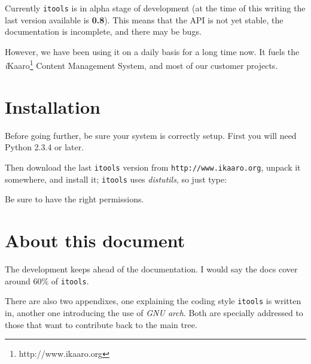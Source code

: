 Currently {\tt itools} is in alpha stage of development (at the time of
this writing the last version available is {\bf 0.8}). This means that the
API is not yet stable, the documentation is incomplete, and there may be bugs.

However, we have been using it on a daily basis for a long time now. It
fuels the {\em i}Kaaro\footnote{http://www.ikaaro.org} Content Management
System, and most of our customer projects.


\section{Installation}

Before going further, be sure your system is correctly setup. First you
will need Python 2.3.4 or later.

Then download the last {\tt itools} version from {\tt http://www.ikaaro.org},
unpack it somewhere, and install it; {\tt itools} uses {\em distutils}, so
just type:


Be sure to have the right permissions.


\section{About this document}

The development keeps ahead of the documentation. I would say the docs cover
around 60\% of {\tt itools}.

There are also two appendixes, one explaining the coding style {\tt itools}
is written in, another one introducing the use of {\em GNU arch}. Both are
specially addressed to those that want to contribute back to the main tree.
